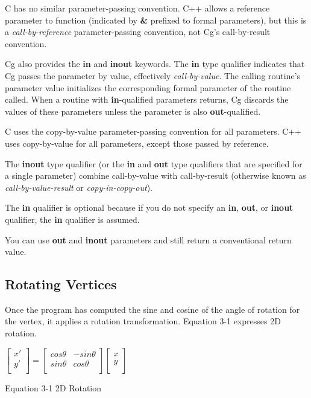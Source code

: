 \documentclass{book}
\begin{document}
C has no similar parameter-passing convention. C++ allows a reference parameter to function (indicated by \textbf{\&} prefixed to formal parameters), but this is a \textit{call-by-reference} parameter-passing convention, not Cg's call-by-result convention.

Cg also provides the \textbf{in} and \textbf{inout} keywords. The \textbf{in} type qualifier indicates that Cg passes the parameter by value, effectively \textit{call-by-value}. The calling routine's parameter value initializes the corresponding formal parameter of the routine called. When a routine with \textbf{in}-qualified parameters returns, Cg discards the values of these parameters unless the parameter is also \textbf{out}-qualified.

C uses the copy-by-value parameter-passing convention for all parameters. C++ uses copy-by-value for all parameters, except those passed by reference.

The \textbf{inout} type qualifier (or the \textbf{in} and \textbf{out} type qualifiers that are specified for a single parameter) combine call-by-value with call-by-result (otherwise known as \textit{call-by-value-result} or \textit{copy-in-copy-out}).

The \textbf{in} qualifier is optional because if you do not specify an \textbf{in}, \textbf{out}, or \textbf{inout} qualifier, the \textbf{in} qualifier is assumed.

You can use \textbf{out} and \textbf{inout} parameters and still return a conventional return value.

\subsection*{Rotating Vertices}

Once the program has computed the sine and cosine of the angle of rotation for the vertex, it applies a rotation transformation. Equation 3-1 expresses 2D rotation.

\FloatBarrier
\begin{equationcaption}
\centering
$
\begin{bmatrix}
x' \\
y' \\
\end{bmatrix}
= 
\begin{bmatrix}
cos \theta & -sin \theta \\
sin \theta & cos \theta \\
\end{bmatrix}
\begin{bmatrix}
x \\
y \\
\end{bmatrix}
$
\caption{Equation 3-1 2D Rotation}
\end{equationcaption}
\FloatBarrier
\end{document}
